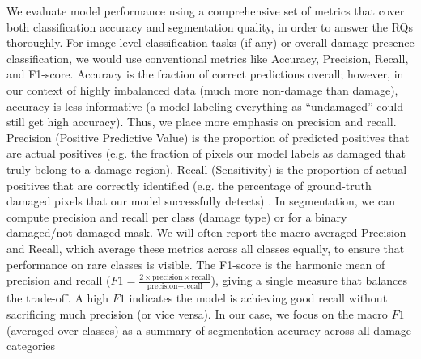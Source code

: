 \documentclass[conference]{IEEEtran}
\begin{document}
We evaluate model performance using a comprehensive set of metrics that cover both classification accuracy and segmentation quality, in order to answer the RQs thoroughly. For image-level classification tasks (if any) or overall damage presence classification, we would use conventional metrics like Accuracy, Precision, Recall, and F1-score. Accuracy is the fraction of correct predictions overall; however, in our context of highly imbalanced data (much more non-damage than damage), accuracy is less informative (a model labeling everything as “undamaged” could still get high accuracy). Thus, we place more emphasis on precision and recall. Precision (Positive Predictive Value) is the proportion of predicted positives that are actual positives (e.g. the fraction of pixels our model labels as damaged that truly belong to a damage region). Recall (Sensitivity) is the proportion of actual positives that are correctly identified (e.g. the percentage of ground-truth damaged pixels that our model successfully detects) \cite{herbert_forecasting_2023,chen_transunet_2021}. In segmentation, we can compute precision and recall per class (damage type) or for a binary damaged/not-damaged mask. We will often report the macro-averaged Precision and Recall, which average these metrics across all classes equally, to ensure that performance on rare classes is visible. The F1-score is the harmonic mean of precision and recall ($F1 = \frac{2\times \text{precision} \times \text{recall}}{\text{precision} +\text{recall}}$), giving a single measure that balances the trade-off. A high $F1$ indicates the model is achieving good recall without sacrificing much precision (or vice versa). In our case, we focus on the macro $F1$ (averaged over classes) as a summary of segmentation accuracy across all damage categories~\cite{ivanova_artefact_2024}
\end{document}
